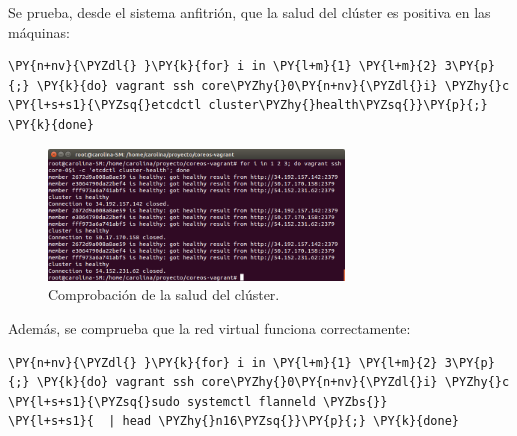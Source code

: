 Se prueba, desde el sistema anfitrión, que la salud del clúster es positiva en las máquinas:

\begin{framed_shaded}
\begin{Verbatim}[fontsize=\relsize{-2.5},fontseries=b,commandchars=\\\{\}]
\PY{n+nv}{\PYZdl{} }\PY{k}{for} i in \PY{l+m}{1} \PY{l+m}{2} 3\PY{p}{;} \PY{k}{do} vagrant ssh core\PYZhy{}0\PY{n+nv}{\PYZdl{}i} \PYZhy{}c \PY{l+s+s1}{\PYZsq{}etcdctl cluster\PYZhy{}health\PYZsq{}}\PY{p}{;} \PY{k}{done}
\end{Verbatim}
\end{framed_shaded}

\begin{figure}[H]
\centering
\includegraphics[width=0.7\textwidth]{images/figures/cluster-health-aws-3.png}
\caption{Comprobación de la salud del clúster.}
\end{figure}

Además, se comprueba que la red virtual funciona correctamente:

\begin{framed_shaded}
\begin{Verbatim}[fontsize=\relsize{-2.5},fontseries=b,commandchars=\\\{\}]
\PY{n+nv}{\PYZdl{} }\PY{k}{for} i in \PY{l+m}{1} \PY{l+m}{2} 3\PY{p}{;} \PY{k}{do} vagrant ssh core\PYZhy{}0\PY{n+nv}{\PYZdl{}i} \PYZhy{}c \PY{l+s+s1}{\PYZsq{}sudo systemctl flanneld \PYZbs{}}
\PY{l+s+s1}{  | head \PYZhy{}n16\PYZsq{}}\PY{p}{;} \PY{k}{done}
\end{Verbatim}
\end{framed_shaded}

